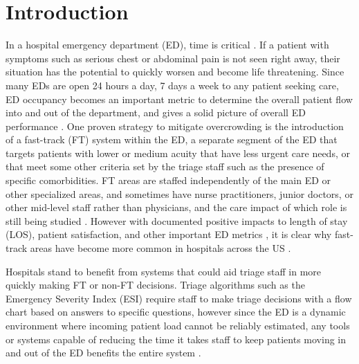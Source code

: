 \documentclass[sigconf]{acmart}
\begin{document}
\section{Introduction}
In a hospital emergency department (ED), time is critical \cite{vanherwerden2024edtriage}. If a patient with symptoms such as serious chest or abdominal pain is not seen right away, their situation has the potential to quickly worsen and become life threatening. Since many EDs are open 24 hours a day, 7 days a week to any patient seeking care, ED occupancy becomes an important metric to determine the overall patient flow into and out of the department, and gives a solid picture of overall ED performance \cite{Mostafa2024}. One proven strategy to mitigate overcrowding is the introduction of a fast-track (FT) system within the ED, a separate segment of the ED that targets patients with lower or medium acuity that have less urgent care needs, or that meet some other criteria set by the triage staff such as the presence of specific comorbidities. FT areas are staffed independently of the main ED or other specialized areas, and sometimes have nurse practitioners, junior doctors, or other mid-level staff rather than physicians, and the care impact of which role is still being studied \cite{Quattrini2011}. However with documented positive impacts to length of stay (LOS), patient satisfaction, and other important ED metrics \cite{Chrusciele026200,Quattrini2011,Nash2007,Hwang2015}, it is clear why fast-track areas have become more common in hospitals across the US \cite{Liu2013}.

Hospitals stand to benefit from systems that could aid triage staff in more quickly making FT or non-FT decisions. Triage algorithms such as the Emergency Severity Index (ESI) require staff to make triage decisions with a flow chart based on answers to specific questions, however since the ED is a dynamic environment where incoming patient load cannot be reliably estimated, any tools or systems capable of reducing the time it takes staff to keep patients moving in and out of the ED benefits the entire system \cite{Mostafa2024}.
\end{document}
